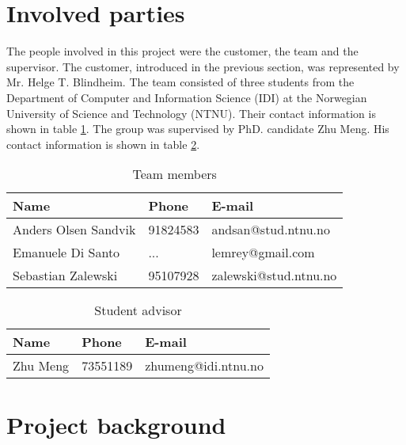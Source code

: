 \section{Involved parties}

The people involved in this project were the customer, the team and the supervisor.
The customer, introduced in the previous section, was represented by Mr. Helge T. Blindheim.
The team consisted of three students from the Department of Computer and Information Science (IDI) at the Norwegian University of Science and Technology (NTNU). Their contact information is shown in table \ref{table:team}. The group was supervised by PhD. candidate Zhu Meng. His contact information is shown in table \ref{table:advisor}.


\begin{table}
\begin{center}
\begin{tabular}{ l | l | l }
  \hline
  Name & Phone & E-mail \\
  \hline\noalign{\smallskip}\noalign{\smallskip}\hline
  Anders Olsen Sandvik	& 91824583 & andsan@stud.ntnu.no \\
  Emanuele Di Santo		& ... & lemrey@gmail.com \\
  Sebastian Zalewski	& 95107928 & zalewski@stud.ntnu.no \\
  \hline
\end{tabular}
\end{center}
\caption{Team members}
\label{table:team}
\end{table}

\begin{table}
\begin{center}
\begin{tabular}{ l | l | l }
  \hline
  Name & Phone & E-mail \\
  \hline\noalign{\smallskip}\noalign{\smallskip}\hline
  Zhu Meng	& 73551189 & zhumeng@idi.ntnu.no \\
  \hline
\end{tabular}
\end{center}
\caption{Student advisor}
\label{table:advisor}
\end{table}


\newpage
\section{Project background}

